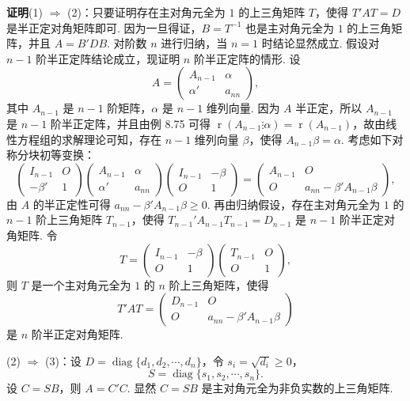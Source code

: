 \documentclass[UTF8, 12pt, fontset=fandol, oneside]{ctexart}
\begin{document}
\noindent\textbf{证明}\quad (1) $\Rightarrow$ (2)：只要证明存在主对角元全为 $1$ 的上三角矩阵 $T$，使得 $T'AT=D$ 是半正定对角矩阵即可. 因为一旦得证，$B=T^{-1}$ 也是主对角元全为 $1$ 的上三角矩阵，并且 $A=B'DB$. 对阶数 $n$ 进行归纳，当 $n=1$ 时结论显然成立. 假设对 $n-1$ 阶半正定阵结论成立，现证明 $n$ 阶半正定阵的情形. 设
\[
A=\left(\begin{array}{cc}
A_{n-1} & \alpha\\
\alpha' & a_{nn}
\end{array}\right),
\]
其中 $A_{n-1}$ 是 $n-1$ 阶矩阵，$\alpha$ 是 $n-1$ 维列向量. 因为 $A$ 半正定，所以 $A_{n-1}$ 是 $n-1$ 阶半正定阵，并且由例 8.75 可得 $\operatorname{r}(A_{n-1}\vdots\alpha)=\operatorname{r}(A_{n-1})$，故由线性方程组的求解理论可知，存在 $n-1$ 维列向量 $\beta$，使得 $A_{n-1}\beta=\alpha$. 考虑如下对称分块初等变换：
\[
\left(\begin{array}{cc}
I_{n-1} & O\\
-\beta' & 1
\end{array}\right)
\left(\begin{array}{cc}
A_{n-1} & \alpha\\
\alpha' & a_{nn}
\end{array}\right)
\left(\begin{array}{cc}
I_{n-1} & -\beta\\
O & 1
\end{array}\right)
=
\left(\begin{array}{cc}
A_{n-1} & O\\
O & a_{nn}-\beta'A_{n-1}\beta
\end{array}\right),
\]
由 $A$ 的半正定性可得 $a_{nn}-\beta'A_{n-1}\beta\ge 0$. 再由归纳假设，存在主对角元全为 $1$ 的 $n-1$ 阶上三角矩阵 $T_{n-1}$，使得 $T_{n-1}'A_{n-1}T_{n-1}=D_{n-1}$ 是 $n-1$ 阶半正定对角矩阵. 令
\[
T=
\left(\begin{array}{cc}
I_{n-1} & -\beta\\
O & 1
\end{array}\right)
\left(\begin{array}{cc}
T_{n-1} & O\\
O & 1
\end{array}\right),
\]
则 $T$ 是一个主对角元全为 $1$ 的 $n$ 阶上三角矩阵，使得
\[
T'AT=
\left(\begin{array}{cc}
D_{n-1} & O\\
O & a_{nn}-\beta'A_{n-1}\beta
\end{array}\right)
\]
是 $n$ 阶半正定对角矩阵.

(2) $\Rightarrow$ (3)：设 $D=\operatorname{diag}\{d_1,d_2,\cdots,d_n\}$，令 $s_i=\sqrt{d_i}\ge 0$，
\[
S=\operatorname{diag}\{s_1,s_2,\cdots,s_n\}.
\]
设 $C=SB$，则 $A=C'C$. 显然 $C=SB$ 是主对角元全为非负实数的上三角矩阵.
\end{document}
